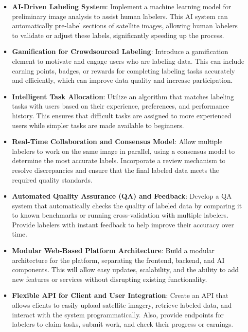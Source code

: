 \documentclass[12pt]{article}
\begin{document}
\begin{itemize}[leftmargin=2cm]
    \item \textbf{AI-Driven Labeling System}: Implement a machine learning model for preliminary image analysis to assist human labelers. This AI system can automatically pre-label sections of satellite images, allowing human labelers to validate or adjust these labels, significantly speeding up the process.
    
    \item \textbf{Gamification for Crowdsourced Labeling}: Introduce a gamification element to motivate and engage users who are labeling data. This can include earning points, badges, or rewards for completing labeling tasks accurately and efficiently, which can improve data quality and increase participation.
    
    \item \textbf{Intelligent Task Allocation}: Utilize an algorithm that matches labeling tasks with users based on their experience, preferences, and performance history. This ensures that difficult tasks are assigned to more experienced users while simpler tasks are made available to beginners.
    
    \item \textbf{Real-Time Collaboration and Consensus Model}: Allow multiple labelers to work on the same image in parallel, using a consensus model to determine the most accurate labels. Incorporate a review mechanism to resolve discrepancies and ensure that the final labeled data meets the required quality standards.
    
    \item \textbf{Automated Quality Assurance (QA) and Feedback}: Develop a QA system that automatically checks the quality of labeled data by comparing it to known benchmarks or running cross-validation with multiple labelers. Provide labelers with instant feedback to help improve their accuracy over time.
    
    \item \textbf{Modular Web-Based Platform Architecture}: Build a modular architecture for the platform, separating the frontend, backend, and AI components. This will allow easy updates, scalability, and the ability to add new features or services without disrupting existing functionality.
    
    \item \textbf{Flexible API for Client and User Integration}: Create an API that allows clients to easily upload satellite imagery, retrieve labeled data, and interact with the system programmatically. Also, provide endpoints for labelers to claim tasks, submit work, and check their progress or earnings.
    

\end{itemize}
\end{document}
